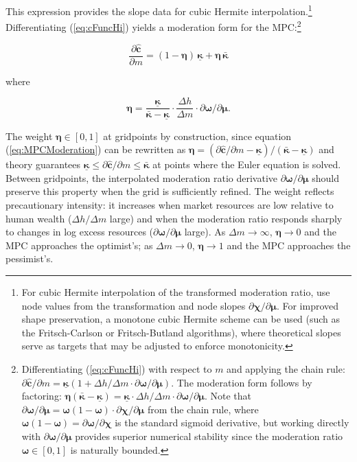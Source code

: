 \documentclass[twocolumn, switch]{article}
\newcommand{\mNrm}{m}
\newcommand{\cFunc}{\mathbf{c}}
\newcommand{\hNrm}{h}
\newcommand{\MPC}{\boldsymbol{\kappa}}
\newcommand{\MPCmin}{\underline{\MPC}}
\newcommand{\logmNrmEx}{\boldsymbol{\mu}}
\newcommand{\modRte}{\boldsymbol{\omega}}
\newcommand{\mNrmEx}{\Delta \mNrm}
\newcommand{\hNrmEx}{\Delta \hNrm}
\newcommand{\cFuncReal}{\hat{\cFunc}}
\newcommand{\logitModRte}{\boldsymbol{\chi}}
\newcommand{\MPCmax}{\bar{\MPC}}
\newcommand{\logitModRteMu}{\partial \logitModRte / \partial \logmNrmEx}
\newcommand{\modRteMu}{\partial \modRte / \partial \logmNrmEx}
\newcommand{\MPCmod}{\boldsymbol{\eta}}
\begin{document}
This expression provides the slope data for cubic Hermite interpolation.\footnote{For cubic Hermite interpolation of the transformed moderation ratio, use node values from the transformation and node slopes $\logitModRteMu$. For improved shape preservation, a monotone cubic Hermite scheme \citep{deBoor2001} can be used (such as the Fritsch-Carlson or Fritsch-Butland algorithms), where theoretical slopes serve as targets that may be adjusted to enforce monotonicity.} Differentiating (\ref{eq:cFuncHi}) yields a moderation form for the MPC:\footnote{Differentiating (\ref{eq:cFuncHi}) with respect to $\mNrm$ and applying the chain rule: $\partial \cFuncReal/\partial \mNrm = \MPCmin \left(1 + \hNrmEx/\mNrmEx \cdot \modRteMu\right)$. The moderation form follows by factoring: $\MPCmod(\MPCmax -\MPCmin) = \MPCmin \cdot \hNrmEx/\mNrmEx \cdot \modRteMu$. Note that $\modRteMu = \modRte(1 -\modRte) \cdot \logitModRteMu$ from the chain rule, where $\modRte(1 -\modRte) = \partial\modRte/\partial\logitModRte$ is the standard sigmoid derivative, but working directly with $\modRteMu$ provides superior numerical stability since the moderation ratio $\modRte \in [0,1]$ is naturally bounded.}

\begin{equation}
\label{eq:MPCModeration}
\frac{\partial \cFuncReal}{\partial \mNrm} = (1-\MPCmod)\,\MPCmin + \MPCmod\,\MPCmax
\end{equation}

where

\begin{equation}
\label{eq:MPCModerationWeight}
\MPCmod = \frac{\MPCmin}{\MPCmax-\MPCmin} \cdot \frac{\hNrmEx}{\mNrmEx} \cdot \partial \modRte / \partial \logmNrmEx.
\end{equation}

The weight $\MPCmod \in [0,1]$ at gridpoints by construction, since equation (\ref{eq:MPCModeration}) can be rewritten as $\MPCmod = (\partial \cFuncReal/\partial \mNrm - \MPCmin)/(\MPCmax - \MPCmin)$ and theory guarantees $\MPCmin \leq \partial \cFuncReal/\partial \mNrm \leq \MPCmax$ at points where the Euler equation is solved. Between gridpoints, the interpolated moderation ratio derivative $\modRteMu$ should preserve this property when the grid is sufficiently refined. The weight reflects precautionary intensity: it increases when market resources are low relative to human wealth ($\hNrmEx/\mNrmEx$ large) and when the moderation ratio responds sharply to changes in log excess resources ($\modRteMu$ large). As $\mNrmEx \to \infty$, $\MPCmod \to 0$ and the MPC approaches the optimist's; as $\mNrmEx \to 0$, $\MPCmod \to 1$ and the MPC approaches the pessimist's.
\end{document}
